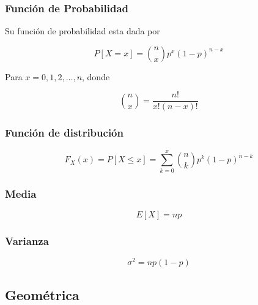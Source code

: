 \documentclass{article}
\begin{document}
                \subsubsection{Función de Probabilidad}

                    Su función de probabilidad esta dada por


                        \begin{equation*}
                            P[X=x]= \binom{n}{x} p^x (1-p)^{n-x}
                        \end{equation*}

                    Para $x=0,1,2,\ldots , n$, donde 

                        \begin{equation*}
                            \binom{n}{x} = \frac{n!}{x!(n-x)!}
                        \end{equation*}
                        
                \subsubsection{Función de distribución }

                        \begin{equation*}
                            F_X(x) = P[X\leq x]= \sum _{k=0}^x \binom{n}{k} p^k(1-p)^{n-k}     
                        \end{equation*}

                \subsubsection{Media}

                \begin{equation*}
                    E[X] = np
                \end{equation*}
                
                \subsubsection{Varianza}

                \begin{equation*}
                    \sigma ^2 = np(1-p)
                \end{equation*}
                        
        \subsection{Geométrica}
\end{document}
